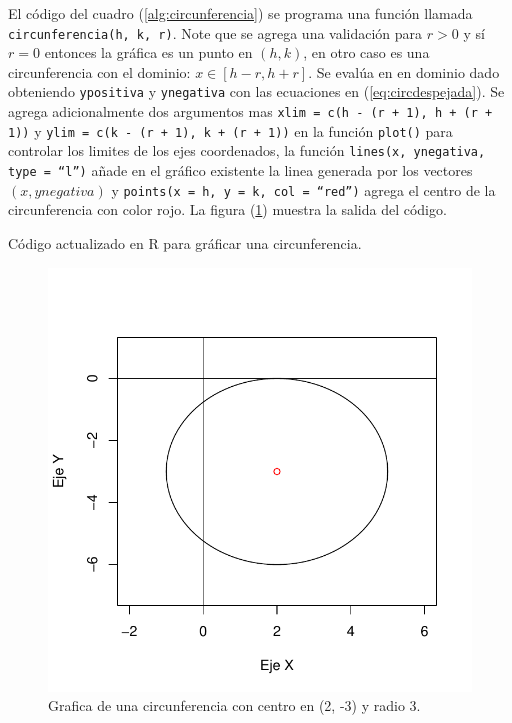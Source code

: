 \documentclass[12pt,a4paper]{article} %
\begin{document}
El código del cuadro (\ref{alg:circunferencia}) se programa una función llamada \texttt{circunferencia(h, k, r)}. Note que se agrega una validación para $r > 0$ y sí $r = 0$ entonces la gráfica es un punto en $(h, k)$, en otro caso es una circunferencia con el dominio: $x \in [h - r, h + r]$. Se evalúa en en dominio dado obteniendo \texttt{ypositiva} y \texttt{ynegativa} con las ecuaciones en (\ref{eq:circdespejada}). Se agrega adicionalmente dos argumentos mas \texttt{xlim = c(h - (r + 1), h + (r + 1))} y \texttt{ylim = c(k - (r + 1), k + (r + 1))} en la función \texttt{plot()} para controlar los limites de los ejes coordenados, la función \texttt{lines(x, ynegativa, type = ``l'')} añade en el gráfico existente la linea generada por los vectores $(x, ynegativa)$ y \texttt{points(x = h, y = k, col = ``red'')} agrega el centro de la circunferencia con color rojo. La figura (\ref{fig:circunferencia}) muestra la salida del código.

\begin{table}[htpb]
	
	\caption{Código actualizado en R para gráficar una circunferencia.}
	\label{alg:circunferencia}
\end{table}

\begin{figure}
\centering
\includegraphics[scale=0.8]{circunferencia}
\caption{Grafica de una circunferencia con centro en (2, -3) y radio 3.}
\label{fig:circunferencia}
\end{figure}
\end{document}
